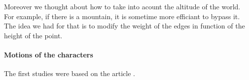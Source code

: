 Moreover we thought about how to take into acount the altitude of the world. For example, if there is a mountain, it is sometime more efficiant to bypass it. The idea we had for that is to modify the weight of the edges in function of the height of the point. 

\paragraph{Motions of the characters}

The first studies were based on the article .%



